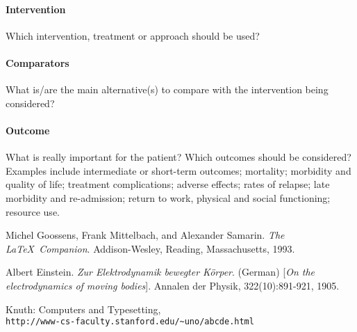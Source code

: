 \paragraph{Intervention} Which intervention, treatment or approach should be used?

\paragraph{Comparators} What is/are the main alternative(s) to compare with the intervention being considered?

\paragraph{Outcome} What is really important for the patient? Which outcomes should be considered? Examples include intermediate or short-term outcomes; mortality; morbidity and quality of life; treatment complications; adverse effects; rates of relapse; late morbidity and re-admission; return to work, physical and social functioning; resource use.


\newpage
{}
\begin{thebibliography}{9}
Michel Goossens, Frank Mittelbach, and Alexander Samarin. 
\textit{The \LaTeX\ Companion}. 
Addison-Wesley, Reading, Massachusetts, 1993.
 
Albert Einstein. 
\textit{Zur Elektrodynamik bewegter K{\"o}rper}. (German) 
[\textit{On the electrodynamics of moving bodies}]. 
Annalen der Physik, 322(10):891-921, 1905.
 
Knuth: Computers and Typesetting,
\\\texttt{http://www-cs-faculty.stanford.edu/\~{}uno/abcde.html}

\end{thebibliography}

